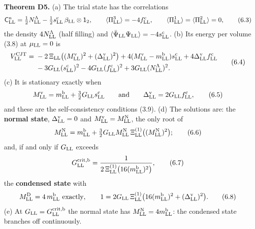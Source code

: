 \documentclass[
  10pt,
]{article}
\begin{document}
\textbf{Theorem D5.} (a) The trial state has the correlations
\[\mathsf C^{\rm n}_{\rm LL}=\tfrac12N^\Lambda_{\rm LL}-\tfrac12s^{\rm c}_{\rm LL}\,\beta_{\rm LL}\otimes\mathsf 1_2,\qquad
\langle\Pi^3_{\rm LL}\rangle=-4f^{\rm c}_{\rm LL},\qquad\langle\Pi^1_{\rm LL}\rangle=\langle\Pi^2_{\rm LL}\rangle=0,\tag{6.3}\]
the density \(4N^\Lambda_{\rm LL}\) (half filling) and
\(\langle\bar\Psi_{\rm LL}\Psi_{\rm LL}\rangle=-4s^{\rm c}_{\rm LL}\).
(b) Its energy per volume (3.8) at \(\mu_{\rm LL}=0\) is
\[\begin{aligned}V^{\rm CJT}_{\rm LL}={}&-2\,\Xi_{\rm LL}\big((M^{\rm v}_{\rm LL})^2+(\Delta^{\rm v}_{\rm LL})^2\big)+4(M^{\rm v}_{\rm LL}-m^{\rm b}_{\rm LL})s^{\rm c}_{\rm LL}+4\Delta^{\rm v}_{\rm LL}f^{\rm c}_{\rm LL}\\
&-3G_{\rm LL}(s^{\rm c}_{\rm LL})^2-4G_{\rm LL}(f^{\rm c}_{\rm LL})^2+3G_{\rm LL}(N^\Lambda_{\rm LL})^2.\end{aligned}\tag{6.4}\]
(c) It is stationary exactly when
\[M^{\rm v}_{\rm LL}=m^{\rm b}_{\rm LL}+\tfrac32G_{\rm LL}s^{\rm c}_{\rm LL}\qquad\text{and}\qquad\Delta^{\rm v}_{\rm LL}=2G_{\rm LL}f^{\rm c}_{\rm LL},\tag{6.5}\]
and these are the self-consistency conditions (3.9). (d) The solutions
are: the \textbf{normal state}, \(\Delta^{\rm v}_{\rm LL}=0\) and
\(M^{\rm v}_{\rm LL}=M^{\rm N}_{\rm LL}\), the only root of
\[M^{\rm N}_{\rm LL}=m^{\rm b}_{\rm LL}+\tfrac32G_{\rm LL}M^{\rm N}_{\rm LL}\,\Xi^{(1)}_{\rm LL}\big((M^{\rm N}_{\rm LL})^2\big);\tag{6.6}\]
and, if and only if \(G_{\rm LL}\) exceeds
\[G^{\rm crit,b}_{\rm LL}=\frac1{2\,\Xi^{(1)}_{\rm LL}\big(16(m^{\rm b}_{\rm LL})^2\big)},\tag{6.7}\]
the \textbf{condensed state} with
\[M^{\rm D}_{\rm LL}=4\,m^{\rm b}_{\rm LL}\ \text{exactly},\qquad 1=2G_{\rm LL}\,\Xi^{(1)}_{\rm LL}\big(16(m^{\rm b}_{\rm LL})^2+(\Delta^{\rm v}_{\rm LL})^2\big).\tag{6.8}\]
(e) At \(G_{\rm LL}=G^{\rm crit,b}_{\rm LL}\) the normal state has
\(M^{\rm N}_{\rm LL}=4m^{\rm b}_{\rm LL}\): the condensed state branches
off continuously.
\end{document}
